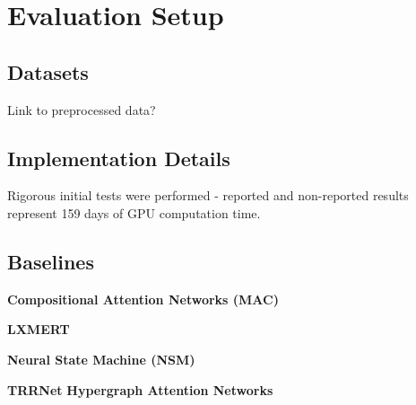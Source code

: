 \chapter{Evaluation Setup}

\section{Datasets}

{\color{red} Link to preprocessed data?}

\section{Implementation Details}

Rigorous initial tests were performed - reported and non-reported results represent 159 days of GPU computation time.



\section{Baselines}

\textbf{Compositional Attention Networks (MAC) \cite{hudson2018compositional}}

\textbf{LXMERT \cite{tan2019lxmert}}

\textbf{Neural State Machine (NSM) \cite{hudson2019learning}}

\textbf{TRRNet} \cite{yangtrrnet}
\textbf{Hypergraph Attention Networks} \cite{kim2020hypergraph}


